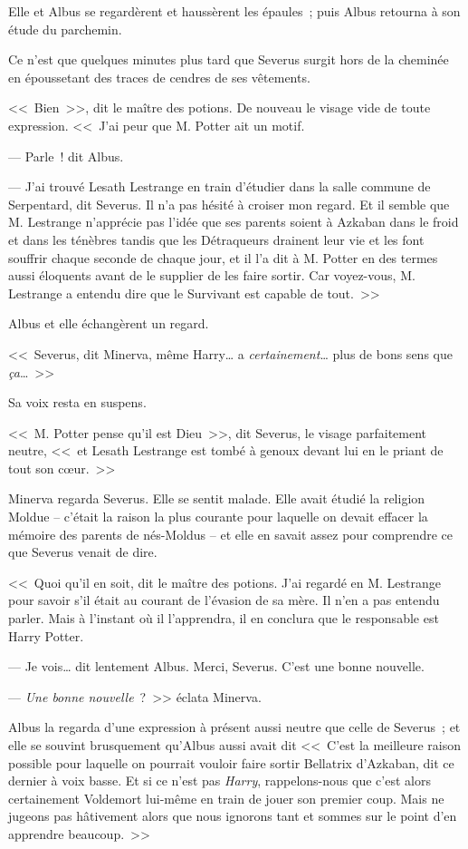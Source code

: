 Elle et Albus se regardèrent et haussèrent les épaules~; puis Albus retourna à son étude du parchemin.

Ce n'est que quelques minutes plus tard que Severus surgit hors de la cheminée en époussetant des traces de cendres de ses vêtements.

<<~Bien~>>, dit le maître des potions. De nouveau le visage vide de toute expression. <<~J'ai peur que M. Potter ait un motif.

--- Parle~! dit Albus.

--- J'ai trouvé Lesath Lestrange en train d'étudier dans la salle commune de Serpentard, dit Severus. Il n'a pas hésité à croiser mon regard. Et il semble que M. Lestrange n'apprécie pas l'idée que ses parents soient à Azkaban dans le froid et dans les ténèbres tandis que les Détraqueurs drainent leur vie et les font souffrir chaque seconde de chaque jour, et il l'a dit à M. Potter en des termes aussi éloquents avant de le supplier de les faire sortir. Car voyez-vous, M. Lestrange a entendu dire que le Survivant est capable de tout.~>>

Albus et elle échangèrent un regard.

<<~Severus, dit Minerva, même Harry… a \emph{certainement}… plus de bons sens que \emph{ça}…~>>

Sa voix resta en suspens.

<<~M. Potter pense qu'il est Dieu~>>, dit Severus, le visage parfaitement neutre, <<~et Lesath Lestrange est tombé à genoux devant lui en le priant de tout son cœur.~>>

Minerva regarda Severus. Elle se sentit malade. Elle avait étudié la religion Moldue -- c'était la raison la plus courante pour laquelle on devait effacer la mémoire des parents de nés-Moldus -- et elle en savait assez pour comprendre ce que Severus venait de dire.

<<~Quoi qu'il en soit, dit le maître des potions. J'ai regardé en M. Lestrange pour savoir s'il était au courant de l'évasion de sa mère. Il n'en a pas entendu parler. Mais à l'instant où il l'apprendra, il en conclura que le responsable est Harry Potter.

--- Je vois… dit lentement Albus. Merci, Severus. C'est une bonne nouvelle.

--- \emph{Une bonne nouvelle}~?~>> éclata Minerva.

Albus la regarda d'une expression à présent aussi neutre que celle de Severus~; et elle se souvint brusquement qu'Albus aussi avait dit <<~C'est la meilleure raison possible pour laquelle on pourrait vouloir faire sortir Bellatrix d'Azkaban, dit ce dernier à voix basse. Et si ce n'est pas \emph{Harry}, rappelons-nous que c'est alors certainement Voldemort lui-même en train de jouer son premier coup. Mais ne jugeons pas hâtivement alors que nous ignorons tant et sommes sur le point d'en apprendre beaucoup.~>>

